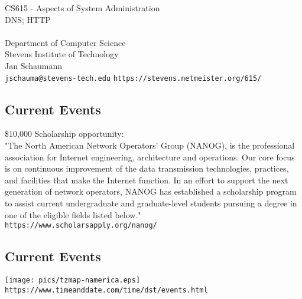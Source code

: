 \documentclass[xga]{xdvislides}
\begin{document}
\setfontphv

\lhead{\slidetitle}                               %
\cfoot{\relax}                               %
\rfoot{\Gray{\today}}

\newcommand{\smallish}{\fontsize{15}{20}\selectfont}

\vspace*{\fill}
\begin{center}
	\Hugesize
		CS615 - Aspects of System Administration\\ [1em]
		DNS; HTTP\\ [1em]
	\hspace*{5mm}\blueline\\ [1em]
	\Normalsize
		Department of Computer Science\\
		Stevens Institute of Technology\\
		Jan Schaumann\\
		\verb+jschauma@stevens-tech.edu+
		\verb+https://stevens.netmeister.org/615/+
\end{center}
\vspace*{\fill}

\subsection{Current Events}

\$10,000 Scholarship opportunity: \\

"The North American Network Operators' Group (NANOG),
is the professional association for Internet
engineering, architecture and operations. Our core
focus is on continuous improvement of the data
transmission technologies, practices, and facilities
that make the Internet function. In an effort to
support the next generation of network operators,
NANOG has established a scholarship program to assist
current undergraduate and graduate-level students
pursuing a degree in one of the eligible fields listed
below." \\

\verb+https://www.scholarsapply.org/nanog/+

\subsection{Current Events}
\vspace*{\fill}
\begin{center}
	\texttt{[image: pics/tzmap-namerica.eps]} \\
	\verb+https://www.timeanddate.com/time/dst/events.html+
\end{center}
\vspace*{\fill}
\end{document}
